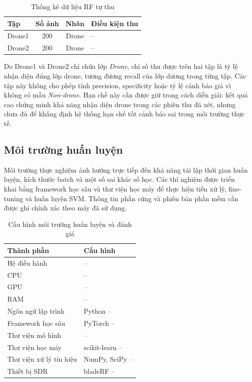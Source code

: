 \documentclass[../DoAn.tex]{subfiles}
\begin{document}
\begin{table}[H]
    \centering
    \caption{Thống kê dữ liệu RF tự thu}
    \label{tab:real_data_statistics}
    \renewcommand{\arraystretch}{1.3}
    \begin{tabular}{|p{}|c|c|p{}|}
        \hline
        \textbf{Tập} & \textbf{Số ảnh} & \textbf{Nhãn} & \textbf{Điều kiện thu} \\ \hline
        Drone1 & 200 & Drone & -- \\ \hline
        Drone2 & 200 & Drone & -- \\ \hline
    \end{tabular}
\end{table}

Do Drone1 và Drone2 chỉ chứa lớp \textit{Drone}, chỉ số thu được trên hai tập là tỷ lệ nhận diện đúng lớp drone, tương đương recall của lớp dương trong từng tập. Các tập này không cho phép tính precision, specificity hoặc tỷ lệ cảnh báo giả vì không có mẫu \textit{Non-drone}. Hạn chế này cần được giữ trong cách diễn giải: kết quả cao chứng minh khả năng nhận diện drone trong các phiên thu đã xét, nhưng chưa đủ để khẳng định hệ thống hạn chế tốt cảnh báo sai trong môi trường thực tế.

\subsection{Môi trường huấn luyện}

Môi trường thực nghiệm ảnh hưởng trực tiếp đến khả năng tái lập thời gian huấn luyện, kích thước batch và một số sai khác số học. Các thí nghiệm được triển khai bằng framework học sâu và thư viện học máy để thực hiện tiền xử lý, fine-tuning và huấn luyện SVM. Thông tin phần cứng và phiên bản phần mềm cần được ghi chính xác theo máy đã sử dụng.

\begin{table}[H]
    \centering
    \caption{Cấu hình môi trường huấn luyện và đánh giá}
    \label{tab:training_environment}
    \renewcommand{\arraystretch}{1.3}
    \begin{tabular}{|p{}|p{}|}
        \hline
        \textbf{Thành phần} & \textbf{Cấu hình} \\ \hline
        Hệ điều hành & -- \\ \hline
        CPU & -- \\ \hline
        GPU & -- \\ \hline
        RAM & -- \\ \hline
        Ngôn ngữ lập trình & Python -- \\ \hline
        Framework học sâu & PyTorch -- \\ \hline
        Thư viện mô hình & -- \\ \hline
        Thư viện học máy & scikit-learn -- \\ \hline
        Thư viện xử lý tín hiệu & NumPy, SciPy -- \\ \hline
        Thiết bị SDR & bladeRF -- \\ \hline
    \end{tabular}
\end{table}
\end{document}
